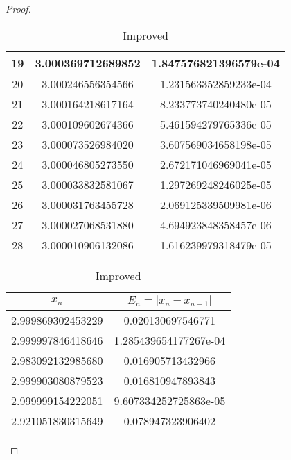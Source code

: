 \begin{enumerate}
\begin{proof}
\begin{table}[H]
\begin{subtable}[t]{.8\textwidth}
\begin{table}[H]
\begin{subtable}[t]{.8\textwidth}
\begin{table}[htbp]
\begin{subtable}[t]{.49\linewidth}
\begin{tabular}{|c|c|c|}
			\footnotesize	19	&	\footnotesize	3.000369712689852	&	\footnotesize	1.847576821396579e-04	\\	\hline
			\footnotesize	20	&	\footnotesize	3.000246556354566	&	\footnotesize	1.231563352859233e-04	\\	\hline
			\footnotesize	21	&	\footnotesize	3.000164218617164	&	\footnotesize	8.233773740240480e-05	\\	\hline
			\footnotesize	22	&	\footnotesize	3.000109602674366	&	\footnotesize	5.461594279765336e-05	\\	\hline
			\footnotesize	23	&	\footnotesize	3.000073526984020	&	\footnotesize	3.607569034658198e-05	\\	\hline
			\footnotesize	24	&	\footnotesize	3.000046805273550	&	\footnotesize	2.672171046969041e-05	\\	\hline
			\footnotesize	25	&	\footnotesize	3.000033832581067	&	\footnotesize	1.297269248246025e-05	\\	\hline
			\footnotesize	26	&	\footnotesize	3.000031763455728	&	\footnotesize	2.069125339509981e-06	\\	\hline
			\footnotesize	27	&	\footnotesize	3.000027068531880	&	\footnotesize	4.694923848358457e-06	\\	\hline
			\footnotesize	28	&	\footnotesize	3.000010906132086	&	\footnotesize	1.616239979318479e-05	\\	\hline
			\end{tabular}
		\end{subtable}
		\ifnum{}
			\centering
			\begin{subtable}[t]{.8\textwidth}
		\else
			\begin{subtable}[t]{.49\linewidth}
		\fi
			\centering
			\caption{Improved}
			\begin{tabular}{|c|c|}
			\hline
			\(x_n\)				&	\(E_n=|x_n-x_{n-1}|\)	\\	\hline
			\footnotesize	2.999869302453229	&	\footnotesize	0.020130697546771	\\	\hline
			\footnotesize	2.999997846418646	&	\footnotesize	1.285439654177267e-04	\\	\hline
			\footnotesize	2.983092132985680	&	\footnotesize	0.016905713432966	\\	\hline
			\footnotesize	2.999903080879523	&	\footnotesize	0.016810947893843	\\	\hline
			\footnotesize	2.999999154222051	&	\footnotesize	9.607334252725863e-05	\\	\hline
			\footnotesize	2.921051830315649	&	\footnotesize	0.078947323906402	\\	\hline

\end{tabular}
\end{subtable}
\end{subtable}
\end{table}
\end{subtable}
\end{table}
\end{subtable}
\end{table}
\end{proof}
\end{enumerate}
